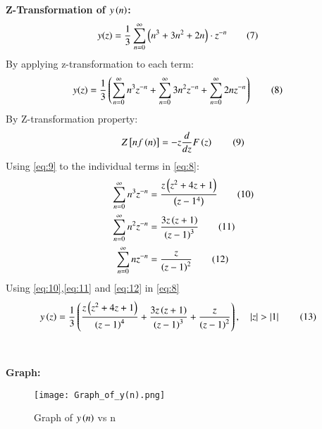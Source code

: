 \documentclass[journal,12pt,twocolumn]{IEEEtran}
\theoremstyle{remark}
\begin{document}
\textbf{Z-Transformation of $y\left(n\right)$:}\\
\begin{align}
y(z)&=\frac{1}{3} \sum_{n=0}^{\infty} \left(n^3 + 3n^2 + 2n\right)\cdot z^{-n}\label{eq:7}\tag{7}
\end{align}
By applying z-transformation to each term:
\begin{align}
    y(z)&=\frac{1}{3}\left(\sum_{n=0}^{\infty}n^3 z^{-n}+\sum_{n=0}^{\infty}3n^2z^{-n}+\sum_{n=0}^{\infty}2nz^{-n}\right) \label{eq:8}\tag{8}
\end{align}
By Z-transformation property:
\begin{align}
Z{}\left[nf\left(n\right)\right]=-z\frac{d}{dz}F\left(z\right)\label{eq:9}\tag{9}
\end{align}
Using \eqref{eq:9} to the individual terms in \eqref{eq:8}:
\begin{align}
\sum_{n=0}^{\infty}n^3 z^{-n}&=\frac{z\left(z^2+4z+1\right)}{\left(z-1^4\right)}\label{eq:10}\tag{10}\\
\sum_{n=0}^{\infty}n^2z^{-n}&=\frac{3z\left(z+1\right)}{\left(z-1\right)^3}\label{eq:11}\tag{11}\\
\sum_{n=0}^{\infty}nz^{-n}&= \frac{z}{\left(z-1\right)^2}\label{eq:12}\tag{12}
\end{align}
Using \eqref{eq:10},\eqref{eq:11} and \eqref{eq:12} in \eqref{eq:8}
\begin{align}
    y\left(z\right)&=\frac{1}{3} \left(\frac{z\left(z^2+4z+1\right)}{\left(z-1\right)^4} + \frac{3z\left(z+1\right)}{\left(z-1\right)^3} + \frac{z}{\left(z-1\right)^2}\right),\quad\left\vert z\right\vert>\left\vert1\right\vert\label{eq:13}\tag{13}
\end{align}\\ \\
\textbf{Graph:}\\
\begin{figure}[h]
        \centering
\texttt{[image: Graph\_of\_y(n).png]}
\caption{Graph of $y\left(n\right)$ vs n}
\label{fig:enter-label}
\end{figure}
\end{document}
